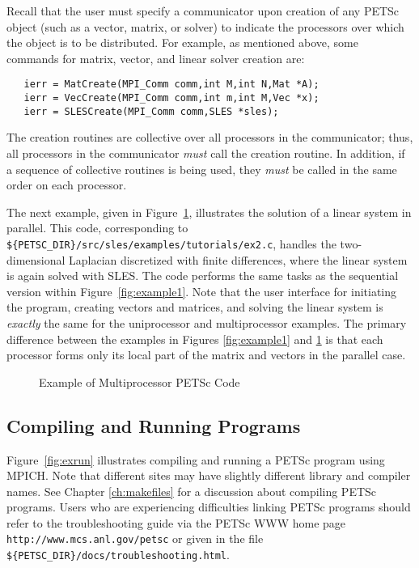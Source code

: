 Recall that the user must specify a communicator upon creation of any
PETSc object (such as a vector, matrix, or solver) to indicate the
processors over which the object is to be distributed.  For example,
as mentioned above, some commands for matrix, vector, and linear solver
creation are:
\begin{verbatim}
   ierr = MatCreate(MPI_Comm comm,int M,int N,Mat *A);
   ierr = VecCreate(MPI_Comm comm,int m,int M,Vec *x);
   ierr = SLESCreate(MPI_Comm comm,SLES *sles); 
\end{verbatim}
The creation routines are collective over all processors in the
communicator; thus, all processors in the communicator {\em must}
call the creation routine.  In addition, if a sequence of
collective routines is being used, they {\em must} be called
in the same order on each processor.

The next example, given in Figure~\ref{fig:example2}, illustrates the
solution of a linear system in parallel.  This code, corresponding to
{\tt \$\{PETSC\_DIR\}/src/sles/examples/tutorials/ex2.c}, handles the
two-dimensional Laplacian discretized with finite differences, where
the linear system is again solved with SLES.  The code performs the
same tasks as the sequential version within Figure~\ref{fig:example1}.
Note that the user interface for initiating the program, creating
vectors and matrices, and solving the linear system is {\em exactly}
the same for the uniprocessor and multiprocessor examples.  The
primary difference between the examples in Figures \ref{fig:example1}
and \ref{fig:example2} is that each processor forms only its local
part of the matrix and vectors in the parallel case.

\begin{figure}[H]
{\footnotesize
{}
}
\nobreak
\caption{Example of Multiprocessor PETSc Code}
\label{fig:example2}
\end{figure}

\subsection*{Compiling and Running Programs}

Figure~\ref{fig:exrun} illustrates compiling and running a PETSc program
using MPICH.  Note that different sites may have slightly different
library and compiler names.  See Chapter \ref{ch:makefiles}
for a discussion about compiling PETSc programs.
Users who are experiencing difficulties linking PETSc programs should 
refer to the troubleshooting guide via the PETSc WWW home page 
{\tt http://www.mcs.anl.gov/petsc} or
given in the file {\tt \$\{PETSC\_DIR\}/docs/troubleshooting.html}.

